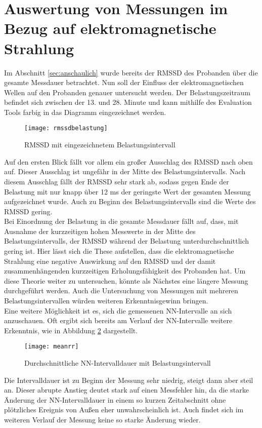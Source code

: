 \section{Auswertung von Messungen im Bezug auf elektromagnetische Strahlung}
Im Abschnitt \ref{sec:anschaulich} wurde bereits der RMSSD des Probanden über die gesamte Messdauer betrachtet. Nun soll der Einfluss der elektromagnetischen Wellen auf den Probanden genauer untersucht werden. Der Belastungszeitraum befindet sich zwischen der 13. und 28. Minute und kann mithilfe des Evaluation Tools farbig in das Diagramm eingezeichnet werden.
\begin{figure}[H]
	\centering
	\texttt{[image: rmssdbelastung]}
	\caption{RMSSD mit eingezeichnetem Belastungsintervall}
	\label{fig:rmssdbelastung}
\end{figure}
Auf den ersten Blick fällt vor allem ein großer Ausschlag des RMSSD nach oben auf. Dieser Ausschlag ist ungefähr in der Mitte des Belastungsintervalls. Nach diesem Ausschlag fällt der RMSSD sehr stark ab, sodass gegen Ende der Belastung mit nur knapp über 12 ms der geringste Wert der gesamten Messung aufgezeichnet wurde. Auch zu Beginn des Belastungsintervalls sind die Werte des RMSSD gering. \\
Bei Einordnung der Belastung in die gesamte Messdauer fällt auf, dass, mit Ausnahme der kurzzeitigen hohen Messwerte in der Mitte des Belastungsintervalls, der RMSSD während der Belastung unterdurchschnittlich gering ist. Hier lässt sich die These aufstellen, dass die elektromagnetische Strahlung eine negative Auswirkung auf den RMSSD und der damit zusammenhängenden kurzzeitigen Erholungsfähigkeit des Probanden hat. Um diese Theorie weiter zu untersuchen, könnte als Nächstes eine längere Messung durchgeführt werden. Auch die Untersuchung von Messungen mit mehreren Belastungsintervallen würden weiteren Erkenntnisgewinn bringen. \\
Eine weitere Möglichkeit ist es, sich die gemessenen NN-Intervalle an sich anzuschauen. Oft ergibt sich bereits am Verlauf der NN-Intervalle weitere Erkenntnis, wie in Abbildung \ref{fig:meanrr} dargestellt.
\begin{figure}[H]
	\centering
	\texttt{[image: meanrr]}
	\caption{Durchschnittliche NN-Intervalldauer mit Belastungsintervall }
	\label{fig:meanrr}
\end{figure}

Die Intervalldauer ist zu Beginn der Messung sehr niedrig, steigt dann aber steil an. Dieser abrupte Anstieg deutet stark auf einen Messfehler hin, da die starke Änderung der NN-Intervalldauer in einem so kurzen Zeitabschnitt ohne plötzliches Ereignis von Außen eher unwahrscheinlich ist. Auch findet sich im weiteren Verlauf der Messung keine so starke Änderung wieder.\\

